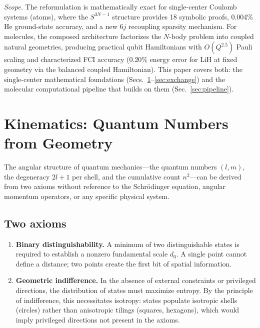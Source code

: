 \documentclass[aps,pra,twocolumn,superscriptaddress,longbibliography]{revtex4-2}
\begin{document}
\noindent\textit{Scope.}  The reformulation is mathematically exact for
single-center Coulomb systems (atoms), where the $S^{3N-1}$ structure
provides 18 symbolic proofs, 0.004\% He ground-state accuracy, and a
new 6$j$ recoupling sparsity mechanism.  For molecules, the composed
architecture factorizes the $N$-body problem into coupled natural
geometries, producing practical qubit Hamiltonians with $O(Q^{2.5})$
Pauli scaling and characterized FCI accuracy (0.20\% energy error for
LiH at fixed geometry via the balanced coupled Hamiltonian).  This paper
covers both: the single-center mathematical foundations
(Secs.~\ref{sec:kinematics}--\ref{sec:exchange}) and the molecular
computational pipeline that builds on them (Sec.~\ref{sec:pipeline}).


\section{Kinematics: Quantum Numbers from Geometry}
\label{sec:kinematics}

The angular structure of quantum mechanics---the quantum numbers
$(l, m)$, the degeneracy $2l + 1$ per shell, and the cumulative count
$n^2$---can be derived from two axioms without reference to the
Schr\"odinger equation, angular momentum operators, or any specific
physical system.

\subsection{Two axioms}

\begin{enumerate}
\item \textbf{Binary distinguishability.}  A minimum of two
  distinguishable states is required to establish a nonzero fundamental
  scale $d_0$.  A single point cannot define a distance; two points
  create the first bit of spatial information.
\item \textbf{Geometric indifference.}  In the absence of external
  constraints or privileged directions, the distribution of states
  must maximize entropy.  By the principle of indifference, this
  necessitates isotropy: states populate isotropic shells (circles)
  rather than anisotropic tilings (squares, hexagons), which would
  imply privileged directions not present in the axioms.
\end{enumerate}
\end{document}
